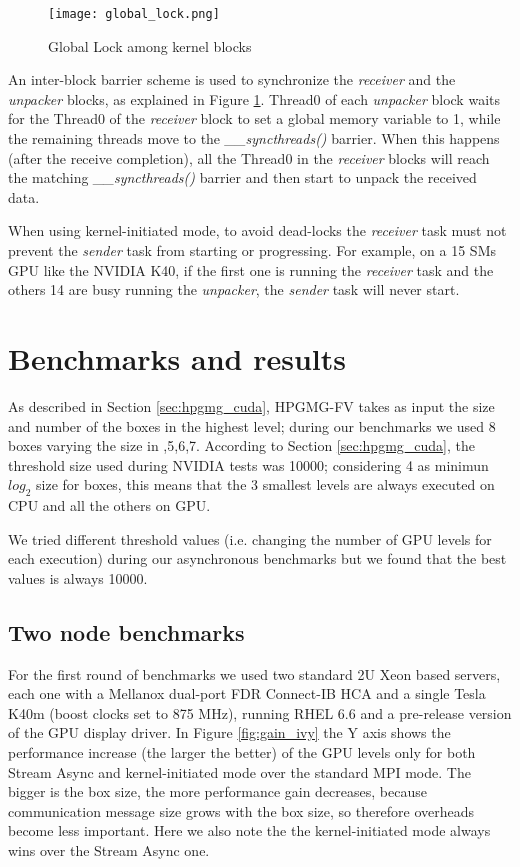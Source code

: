 \documentclass[conference]{IEEEtran}
\begin{document}
\begin{figure}[h]
\texttt{[image: global\_lock.png]}
\caption{Global Lock among kernel blocks}
\label{fig:global_lock}
\end{figure}

An inter-block barrier scheme is used to synchronize the \textit{receiver}
and the \textit{unpacker} blocks, as explained in Figure
\ref{fig:global_lock}.
% 
Thread0 of each \textit{unpacker} block waits for the Thread0 of the
\textit{receiver} block to set a global memory variable to 1, while the
remaining threads move to the \textit{\_\_syncthreads()} barrier.
%
When this happens (after the receive completion), all the Thread0 in the
\textit{receiver} blocks will reach the matching \textit{\_\_syncthreads()}
barrier and then start to unpack the received data.

When using kernel-initiated mode, to avoid dead-locks the \textit{receiver}
task must not prevent the \textit{sender} task from starting or
progressing.
% 
For example, on a 15 SMs GPU like the NVIDIA K40, if the first one is running the
\textit{receiver} task and the others 14 are busy running the
\textit{unpacker}, the \textit{sender} task will never start.

\section{Benchmarks and results}

As described in Section \ref{sec:hpgmg_cuda}, HPGMG-FV takes as input the size and number of the boxes in the highest level; during our benchmarks we used 8 boxes varying the size in ,5,6,7\rbrack.
According to Section \ref{sec:hpgmg_cuda}, the threshold size used during NVIDIA tests was 10000; considering 4 as minimun $log_2$ size for boxes, this means that the 3 smallest levels are always executed on CPU and all the others on GPU.

We tried different threshold values (i.e. changing the number of GPU levels for each execution) during our asynchronous benchmarks but we found that the best values is always 10000.

\subsection{Two node benchmarks}
\label{sec:two-nodes}

For the first round of benchmarks we used two standard 2U Xeon based
servers, each one with a Mellanox dual-port FDR Connect-IB HCA and a single
Tesla K40m (boost clocks set to 875 MHz), running RHEL 6.6 and a
pre-release version of the GPU display driver.
% 
In Figure \ref{fig:gain_ivy} the Y axis shows the performance increase (the
larger the better) of the GPU levels only for both Stream Async and
kernel-initiated mode over the standard MPI mode. 
%
The bigger is the box size, the more performance gain decreases, because
communication message size grows with the box size, so therefore
overheads become less important.
% 
Here we also note the the kernel-initiated mode always wins over the
Stream Async one.
\end{document}
